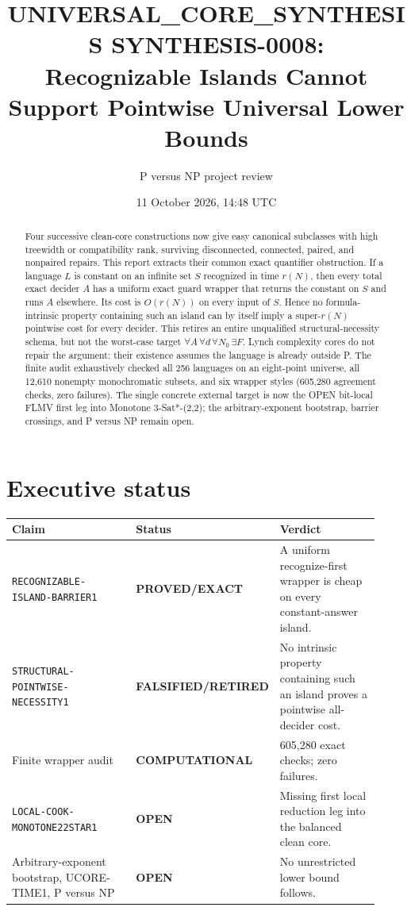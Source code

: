 \documentclass[11pt]{article}
\title{UNIVERSAL\_CORE\_SYNTHESIS SYNTHESIS-0008:\\
Recognizable Islands Cannot Support Pointwise Universal Lower Bounds}
\author{P versus NP project review}
\date{11 October 2026, 14:48 UTC}
\newcommand{\EXACT}{\textbf{PROVED/EXACT}}
\newcommand{\OPEN}{\textbf{OPEN}}
\newcommand{\RETIRED}{\textbf{FALSIFIED/RETIRED}}
\newcommand{\COMP}{\textbf{COMPUTATIONAL}}
\begin{document}
\maketitle

\begin{abstract}
Four successive clean-core constructions now give easy canonical subclasses
with high treewidth or compatibility rank, surviving disconnected, connected,
paired, and nonpaired repairs.  This report extracts their common exact
quantifier obstruction.  If a language $L$ is constant on an infinite set
$S$ recognized in time $r(N)$, then every total exact decider $A$ has a
uniform exact guard wrapper that returns the constant on $S$ and runs $A$
elsewhere.  Its cost is $O(r(N))$ on every input of $S$.  Hence no
formula-intrinsic property containing such an island can by itself imply a
super-$r(N)$ pointwise cost for every decider.  This retires an entire
unqualified structural-necessity schema, but not the worst-case target
$\forall A\,\forall d\,\forall N_0\,\exists F$.  Lynch complexity cores do
not repair the argument: their existence assumes the language is already
outside P.  The finite audit exhaustively checked all 256 languages on an
eight-point universe, all 12,610 nonempty monochromatic subsets, and six
wrapper styles (605,280 agreement checks, zero failures).  The single
concrete external target is now the OPEN bit-local FLMV first leg into
Monotone 3-Sat*-(2,2); the arbitrary-exponent bootstrap, barrier crossings,
and P versus NP remain open.
\end{abstract}

\section{Executive status}
\begin{center}\footnotesize
\begin{tabular}{@{}p{0.39\linewidth}p{0.20\linewidth}p{0.33\linewidth}@{}}
\toprule Claim & Status & Verdict\\ \midrule
\texttt{RECOGNIZABLE-ISLAND-BARRIER1} & \EXACT & A uniform
recognize-first wrapper is cheap on every constant-answer island.\\
\texttt{STRUCTURAL-POINTWISE-NECESSITY1} & \RETIRED & No intrinsic
property containing such an island proves a pointwise all-decider cost.\\
Finite wrapper audit & \COMP & 605,280 exact checks; zero failures.\\
\texttt{LOCAL-COOK-MONOTONE22STAR1} & \OPEN & Missing first local
reduction leg into the balanced clean core.\\
Arbitrary-exponent bootstrap, UCORE-TIME1, P versus NP & \OPEN & No
unrestricted lower bound follows.\\
\bottomrule
\end{tabular}
\end{center}
\end{document}
